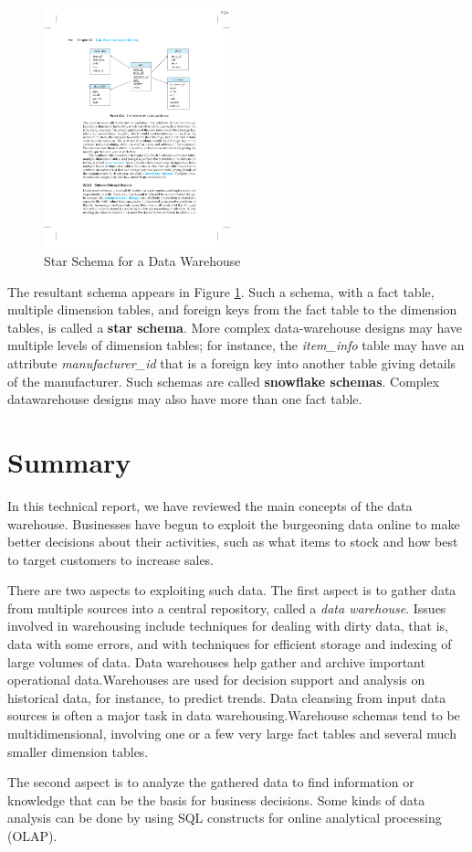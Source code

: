 \documentclass{vldb}
\begin{document}
\begin{figure}[htb]
\centering
\includegraphics[width=0.48\textwidth]{starschema}
\caption{Star Schema for a Data Warehouse}
\label{fig:starschema}
\end{figure}

The resultant schema appears in Figure \ref{fig:starschema}. Such a schema, with a fact table,
multiple dimension tables, and foreign keys from the fact table to the dimension
tables, is called a \textbf{star schema}. More complex data-warehouse designs may have
multiple levels of dimension tables; for instance, the \textit{item\_info} table may have an
attribute \textit{manufacturer\_id} that is a foreign key into another table giving details of
the manufacturer. Such schemas are called \textbf{snowflake schemas}. Complex datawarehouse
designs may also have more than one fact table.

\section{Summary}
In this technical report, we have reviewed the main concepts of the data warehouse.
Businesses have begun to exploit the burgeoning data online to make better
decisions about their activities, such as what items to stock and how best to target
customers to increase sales. 

There are two aspects to exploiting such data. The first aspect is to gather data from multiple sources into a central repository, called a \textit{data warehouse}. Issues involved in warehousing include techniques for dealing
with dirty data, that is, data with some errors, and with techniques for efficient
storage and indexing of large volumes of data.
Data warehouses help gather and archive important operational data.Warehouses
are used for decision support and analysis on historical data, for
instance, to predict trends. Data cleansing from input data sources is often a
major task in data warehousing.Warehouse schemas tend to be multidimensional,
involving one or a few very large fact tables and several much smaller
dimension tables.

The second aspect is to analyze the gathered data to find information or
knowledge that can be the basis for business decisions. Some kinds of data analysis
can be done by using SQL constructs for online analytical processing (OLAP).






\end{document}
